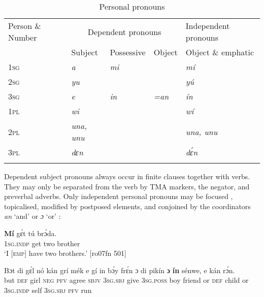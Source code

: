 \begin{table}
\caption{Personal pronouns}
\label{tab:key:5.6}

\begin{tabularx}{\textwidth}{Xllll}
\lsptoprule

Person \& Number & \multicolumn{3}{c}{ Dependent pronouns} & Independent pronouns\\
& Subject & \multicolumn{1}{c}{ Possessive} & \multicolumn{1}{c}{ Object} & Object \& emphatic\\
\midrule
\textsc{1sg} & \itshape a & \itshape mi &  & \itshape mí\\
\textsc{2sg} & \itshape yu &  &  & \itshape yú\\
\textsc{3sg} & \itshape e & \itshape in & \itshape =an & \itshape ín\\
\textsc{1pl} & \itshape wi &  &  & \itshape wí\\
\textsc{2pl} & \itshape una, unu &  &  & \itshape una, unu\\
\textsc{3pl} & \itshape dɛn &  &  & \itshape dɛ́n\\
\lspbottomrule
\end{tabularx}
\end{table}

Dependent subject pronouns always occur in finite clauses together with verbs. They may only be separated from the verb by TMA markers, the negator, and preverbal adverbs. Only independent personal pronouns may be focused , topicalised, modified by postposed elements, and conjoined by the coordinators \textit{an} ‘and’ or \textit{ɔ} ‘or’ :

\ea%
    \label{ex:key:278}
    \gll \textbf{Mí}    gɛ́t  tú  brɔ́da.\\
\textsc{1sg.indp}  get  two  brother\\

\glt ‘I [\textsc{emp}] have two brothers.’ [ro07fn 501]
\z

\ea%
    \label{ex:key:279}
    \gll Bɔt  di  gɛ́l  nó  kán  grí    mék    e    gí  in    bɔ́y  frɛ́n
ɔ  di  pikín  \textbf{ɔ} \textbf{ ín}    sénwe,  e    kán  rɔ́n.\\
but  \textsc{def}  girl  \textsc{neg}  \textsc{pfv}  agree  \textsc{sbjv}    \textsc{3sg.sbj}  give  \textsc{3sg.poss}  boy  friend
or  \textsc{def}  child  or  \textsc{3sg.indp}  self    \textsc{3sg.sbj}  \textsc{pfv}  run\\

